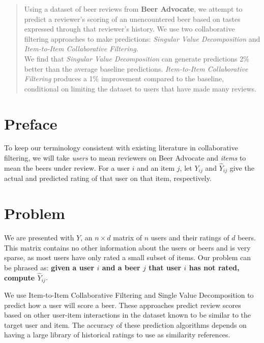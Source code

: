 \documentclass[12pt]{article}
\begin{document}
\maketitle
\begin{abstract}
Using a dataset of beer reviews from \textbf{Beer Advocate}, we attempt to predict a reviewer's scoring of an unencountered beer based on tastes expressed through that reviewer's history. We use two collaborative filtering approaches to make predictions: \textit{Singular Value Decomposition} and \textit{Item-to-Item Collaborative Filtering}. \\

We find that \textit{Singular Value Decomposition} can generate predictions 2\% better than the average baseline predictions. \textit{Item-to-Item Collaborative Filtering} produces a 1\% improvement compared to the baseline, conditional on limiting the dataset to users that have made many reviews. \\
\end{abstract}

\section{Preface}
To keep our terminology consistent with existing literature in collaborative filtering, we will take \textit{users} to mean reviewers on Beer Advocate and \textit{items} to mean the beers under review. For a user $i$ and an item $j$, let $Y_{ij}$ and $\hat Y_{ij}$ give the actual and predicted rating of that user on that item, respectively.

\section{Problem}
We are presented with $Y$, an $n \times d$ matrix of $n$ users and their ratings of $d$ beers. This matrix contains no other information about the users or beers and is very sparse, as most users have only rated a small subset of items. Our problem can be phrased as: \textbf{given a user $i$ and a beer $j$ that user $i$ has not rated, compute $\hat Y_{ij}$}.

We use Item-to-Item Collaborative Filtering and Single Value Decomposition to predict how a user will score a beer. These approaches predict review scores based on other user-item interactions in the dataset known to be similar to the target user and item. The accuracy of these prediction algorithms depends on having a large library of historical ratings to use as similarity references.\textsuperscript{\cite{sarwar}}
\end{document}
